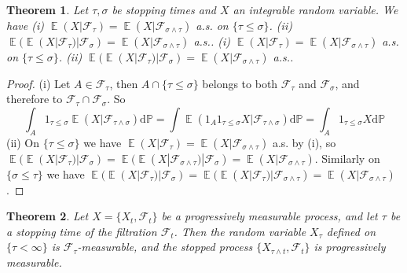 \documentclass{article}
\newtheorem{Thm}{Theorem}[section]
\theoremstyle{definition}
\newcommand{\EE}{\operatorname{\mathbb{E}}}
\newcommand{\PP}{\mathbb{P}}
\renewcommand{\leq}{\leqslant}
\newcommand{\<}{\left\langle}
\renewcommand{\>}{\right\rangle}
\begin{document}
\begin{Thm}
    Let $\tau,\sigma$ be stopping times and $X$ an integrable random variable. We have \newline 
    (i) $\EE(X|\mathcal{F}_\tau)=\EE(X|\mathcal{F}_{\sigma\wedge \tau})$ a.s. on $\{\tau\leq \sigma\}$.\newline 
    (ii) $\EE(\EE(X|\mathcal{F}_\tau)|\mathcal{F}_\sigma)=\EE(X|\mathcal{F}_{\sigma\wedge \tau})$ a.s..
    (i) $\EE(X|\mathcal{F}_\tau)=\EE(X|\mathcal{F}_{\sigma\wedge \tau})$ a.s. on $\{\tau\leq \sigma\}$.\newline 
    (ii) $\EE(\EE(X|\mathcal{F}_\tau)|\mathcal{F}_\sigma)=\EE(X|\mathcal{F}_{\sigma\wedge \tau})$ a.s..
\end{Thm}
\begin{proof}
    (i) Let $A\in\mathcal{F}_\tau$, then $A\cap \{\tau\leq \sigma\}$ belongs to both $\mathcal{F}_\tau$ and $\mathcal{F}_\sigma$, and therefore to $\mathcal{F}_\tau\cap\mathcal{F}_\sigma$. So 
    \[ \int_A 1_{\tau\leq \sigma} \EE(X|\mathcal{F}_{\tau\wedge\sigma})\mathrm{d}\PP=\int \EE(1_A1_{\tau\leq \sigma}X|\mathcal{F}_{\tau\wedge\sigma})\mathrm{d}\PP=\int_A1_{\tau\leq \sigma}X\mathrm{d}\PP\]
    (ii) On $\{\tau\leq\sigma\}$ we have $\EE(X|\mathcal{F}_\tau)=\EE(X|\mathcal{F}_{\sigma\wedge \tau})$ a.s. by (i), so 
    $\EE(\EE(X|\mathcal{F}_\tau)|\mathcal{F}_\sigma)=\EE(\EE(X|\mathcal{F}_{\sigma\wedge \tau})|\mathcal{F}_\sigma)=\EE(X|\mathcal{F}_{\sigma\wedge \tau})$. Similarly on
    $\{\sigma\leq \tau\}$ we have $\EE(\EE(X|\mathcal{F}_\tau)|\mathcal{F}_\sigma)=\EE(\EE(X|\mathcal{F}_\tau)|\mathcal{F}_{\sigma\wedge \tau})=\EE(X|\mathcal{F}_{\sigma\wedge \tau})$.
\end{proof}
\begin{Thm}
    Let $X=\{X_t,\mathcal{F}_t\}$ be a progressively measurable process, and let $\tau$ be a stopping time of the filtration $\mathcal{F}_t$.
    Then the random variable $X_\tau$ defined on $\{\tau<\infty\}$ is $\mathcal{F}_\tau$-measurable, and the stopped process 
    $\{X_{\tau\wedge t},\mathcal{F}_t\}$ is progressively measurable.
\end{Thm}
\end{document}
